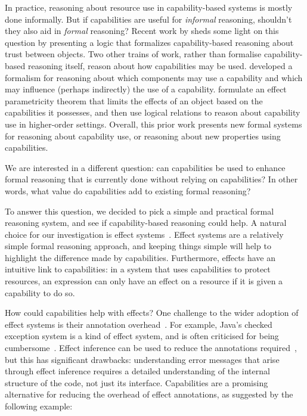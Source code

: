 \documentclass[sigplan,10pt,review]{acmart}\settopmatter{printfolios=true,printccs=false,printacmref=false}
\begin{document}
In practice, reasoning about resource use in capability-based systems is mostly done informally.
But if capabilities are useful for \textit{informal} reasoning, shouldn't they also aid in \textit{formal} reasoning?
Recent work by \citet{drossopoulou07} sheds some light on this question by presenting a logic that formalizes capability-based reasoning about trust between objects.
Two other trains of work, rather than formalise capability-based reasoning itself, reason about how capabilities may be used.
\citet{dimoulas14} developed a formalism for reasoning about which components may use a capability and which may influence (perhaps indirectly) the use of a capability.
\citet{devriese16} formulate an effect parametricity theorem that limits the effects of an object based on the capabilities it possesses, and then use logical relations to reason about capability use in higher-order settings.
Overall, this prior work presents new formal systems for reasoning about capability use, or reasoning about new properties using capabilities.

We are interested in a different question: can capabilities be used to enhance formal reasoning that is currently done without relying on capabilities?
In other words, what value do capabilities add to existing formal reasoning?

To answer this question, we decided to pick a simple and practical formal reasoning system, and see if capability-based reasoning could help.
A natural choice for our investigation is effect systems~\cite{nielson99}.
Effect systems are a relatively simple formal reasoning approach, and keeping things simple will help to highlight the difference made by capabilities.%
Furthermore, effects have an intuitive link to capabilities: in a system that uses capabilities to protect resources, an expression can only have an effect on a resource if it is given a capability to do so.

How could capabilities help with effects?
One challenge to the wider adoption of effect systems is their annotation overhead~\cite{rytz12}.
For example, Java's checked exception system is a kind of effect system, and is often criticised for being cumbersome~\cite{Kiniry2006}.
Effect inference can be used to reduce the annotations required~\cite{koka14}, but this has significant drawbacks: understanding error messages that arise through effect inference requires a detailed understanding of the internal structure of the code, not just its interface.
Capabilities are a promising alternative for reducing the overhead of effect annotations, as suggested by the following example:
\end{document}
